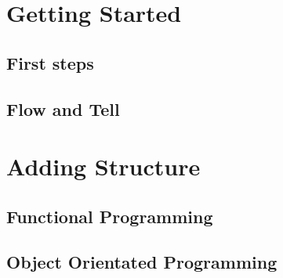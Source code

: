 \usepackage{lipsum}




\coverpage{\TITLE}{\SUBTITLE}{\AUTHOR}{\DATE}{\SUBJECT}
\newpage
\tableofcontents

\part{Getting Started}
\newpage
\chapter{First steps} \label{ch:first}



\newpage
\chapter{Flow and Tell}\label{ch:flow}




\part{Adding Structure}
\newpage
\chapter{Functional Programming} \label{ch:Functional}

\newpage

\chapter{Object Orientated Programming} 
\label{ch:OOP}


